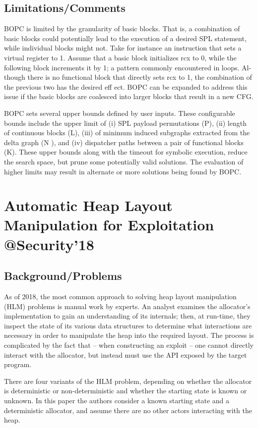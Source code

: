 \subsection{Limitations/Comments}
BOPC is limited by the granularity of basic blocks. That is, a combination of basic blocks could potentially lead to the execution of a desired SPL statement, while individual blocks might not. Take for instance an instruction that sets a virtual register to 1. Assume that a basic block initializes rcx to 0, while the following block increments it by 1; a pattern commonly encountered in loops. Al- though there is no functional block that directly sets rcx to 1, the combination of the previous two has the desired eff ect. BOPC can be expanded to address this issue if the basic blocks are coalesced into larger blocks that result in a new CFG.

BOPC sets several upper bounds defined by user inputs. These configurable bounds include the upper limit of (i) SPL payload permutations (P), (ii) length of continuous blocks (L), (iii) of minimum induced subgraphs extracted from the delta graph (N ), and (iv) dispatcher paths between a pair of functional blocks (K). These upper bounds along with the timeout for symbolic execution, reduce the search space, but prune some potentially valid solutions. The evaluation of higher limits may result in alternate or more solutions being found by BOPC.
\newpage
\section{Automatic Heap Layout Manipulation for Exploitation \\@Security'18}
\subsection{Background/Problems}
As of 2018, the most common approach to solving heap layout manipulation (HLM) problems is manual work by experts.  An analyst examines the allocator’s implementation to gain an understanding of its internals; then, at run-time, they inspect the state of its various data structures to determine what interactions are necessary in order to manipulate the heap into the required layout. The process is complicated by the fact that – when constructing an exploit – one cannot directly interact with the allocator, but instead must use the API exposed by the target program. 

There are four variants of the HLM problem, depending on whether the allocator is deterministic or non-deterministic and whether the starting state is known or unknown. In this paper the authors consider a known starting state and a deterministic allocator, and assume there are no other actors interacting with the heap. 

